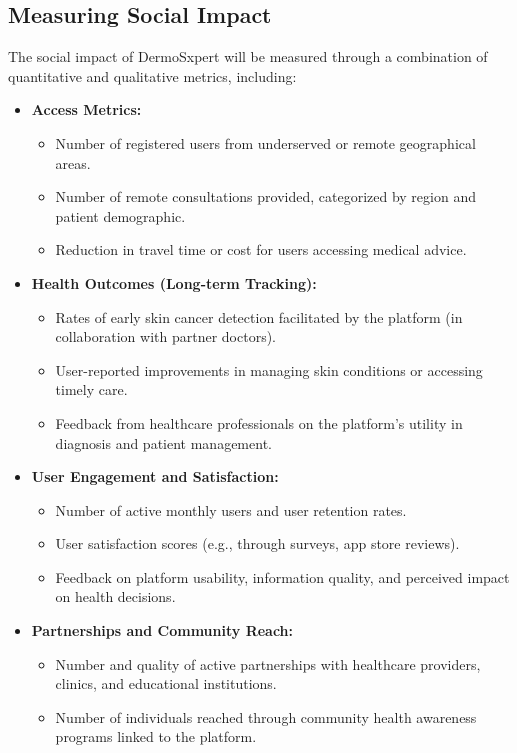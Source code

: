 \subsection{Measuring Social Impact}
The social impact of DermoSxpert will be measured through a combination of quantitative and qualitative metrics, including:
\begin{itemize}
  \item \textbf{Access Metrics:}
    \begin{itemize}
        \item Number of registered users from underserved or remote geographical areas.
        \item Number of remote consultations provided, categorized by region and patient demographic.
        \item Reduction in travel time or cost for users accessing medical advice.
    \end{itemize}
  \item \textbf{Health Outcomes (Long-term Tracking):}
    \begin{itemize}
        \item Rates of early skin cancer detection facilitated by the platform (in collaboration with partner doctors).
        \item User-reported improvements in managing skin conditions or accessing timely care.
        \item Feedback from healthcare professionals on the platform's utility in diagnosis and patient management.
    \end{itemize}
  \item \textbf{User Engagement and Satisfaction:}
    \begin{itemize}
        \item Number of active monthly users and user retention rates.
        \item User satisfaction scores (e.g., through surveys, app store reviews).
        \item Feedback on platform usability, information quality, and perceived impact on health decisions.
    \end{itemize}
  \item \textbf{Partnerships and Community Reach:}
    \begin{itemize}
        \item Number and quality of active partnerships with healthcare providers, clinics, and educational institutions.
        \item Number of individuals reached through community health awareness programs linked to the platform.
    \end{itemize}
\end{itemize}

